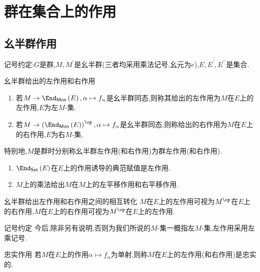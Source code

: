 \chapter{群在集合上的作用}

\section{幺半群作用}

记号约定:$G$是群,$M,M^{\prime}$是幺半群(三者均采用乘法记号,幺元为$e$),$E,E^{\prime},E^{\prime\prime}$是集合.

\begin{definition}{幺半群给出的左作用和右作用}{}
	\begin{enumerate}
		\item 若$M\to\End_{\mathsf{Mon}}\left(E\right),\alpha\mapsto f_{\alpha}$是幺半群同态,则称其给出的左作用为$M$在$E$上的左作用,$E$为左$M$-集.
		\item 若$M\to\left(\End_{\mathsf{Mon}}\left(E\right)\right)^{\op},\alpha\mapsto f_{\alpha}$是幺半群同态,则称给出的右作用为$M$在$E$上的右作用,$E$为右$M$-集.
	\end{enumerate}
	特别地,$M$是群时分别称幺半群左作用(和右作用)为群左作用(和右作用).
\end{definition}

\begin{example}{}{}
	\begin{enumerate}
		\item $\End_{\mathsf{Set}}\left(E\right)$在$E$上的作用诱导的典范赋值是左作用.
		\item $M$上的乘法给出$M$在$M$上的左平移作用和右平移作用.
	\end{enumerate}
\end{example}

\begin{proposition}{幺半群给出左作用和右作用之间的相互转化}{}
	$M$在$E$上的左作用可视为$M^{\op}$在$E$上的右作用,$M$在$E$上的右作用可视为$M^{\op}$在$E$上的左作用.
\end{proposition}

\begin{remark}{记号约定}{}
	今后,除非另有说明,否则为我们所说的$M$-集一概指左$M$-集,左作用采用左乘记号.
\end{remark}

\begin{definition}{忠实作用}{}
	若$M$在$E$上的作用$\alpha\mapsto f_{\alpha}$为单射,则称$M$在$E$上的左作用(和右作用)是忠实的.
\end{definition}

